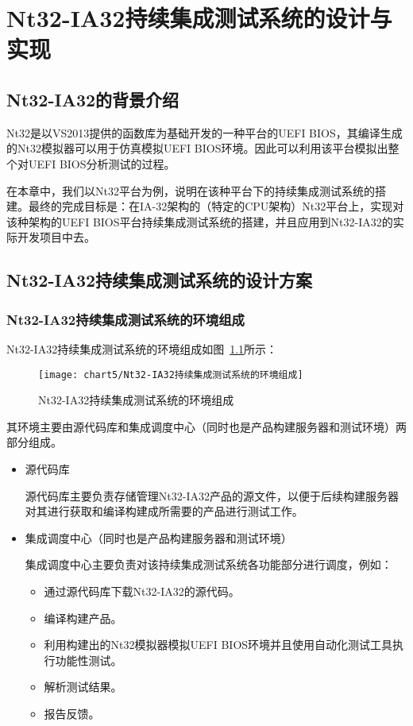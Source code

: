 \chapter{Nt32-IA32持续集成测试系统的设计与实现}
\label{cha:intro}

\section{Nt32-IA32的背景介绍}
	
	Nt32是以VS2013提供的函数库为基础开发的一种平台的UEFI BIOS，其编译生成的Nt32模拟器可以用于仿真模拟UEFI BIOS环境。因此可以利用该平台模拟出整个对UEFI BIOS分析测试的过程。
	
	在本章中，我们以Nt32平台为例，说明在该种平台下的持续集成测试系统的搭建。最终的完成目标是：在IA-32架构的（特定的CPU架构）Nt32平台上，实现对该种架构的UEFI BIOS平台持续集成测试系统的搭建，并且应用到Nt32-IA32的实际开发项目中去。

\section{Nt32-IA32持续集成测试系统的设计方案}
	\subsection{Nt32-IA32持续集成测试系统的环境组成}
		
		Nt32-IA32持续集成测试系统的环境组成如图~\ref{fig:Nt32-IA32持续集成测试系统的环境组成}所示：
		
		\begin{figure}[H] %
			\centering
			\texttt{[image: chart5/Nt32-IA32持续集成测试系统的环境组成]}
			\caption{Nt32-IA32持续集成测试系统的环境组成}
			\label{fig:Nt32-IA32持续集成测试系统的环境组成}
		\end{figure}
		
		其环境主要由源代码库和集成调度中心（同时也是产品构建服务器和测试环境）两部分组成。
		
		\begin{itemize}
			\item 源代码库
			
				源代码库主要负责存储管理Nt32-IA32产品的源文件，以便于后续构建服务器对其进行获取和编译构建成所需要的产品进行测试工作。
			\item 集成调度中心（同时也是产品构建服务器和测试环境）
			
				集成调度中心主要负责对该持续集成测试系统各功能部分进行调度，例如：
					\begin{itemize}
						\item 通过源代码库下载Nt32-IA32的源代码。
						\item 编译构建产品。
						\item 利用构建出的Nt32模拟器模拟UEFI BIOS环境并且使用自动化测试工具执行功能性测试。
						\item 解析测试结果。
						\item 报告反馈。
					\end{itemize}
		\end{itemize}
		
